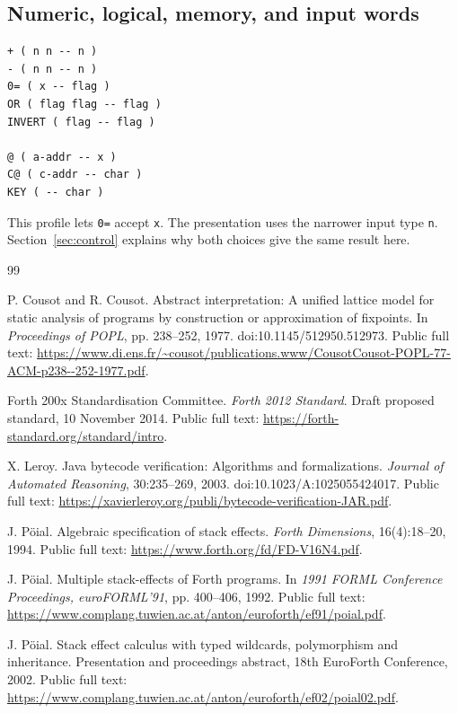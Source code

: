 \documentclass[11pt,a4paper]{article}
\begin{document}
\subsection{Numeric, logical, memory, and input words}
\begin{verbatim}
+ ( n n -- n )
- ( n n -- n )
0= ( x -- flag )
OR ( flag flag -- flag )
INVERT ( flag -- flag )

@ ( a-addr -- x )
C@ ( c-addr -- char )
KEY ( -- char )
\end{verbatim}
This profile lets \texttt{0=} accept \texttt{x}.  The presentation uses the
narrower input type \texttt{n}.  Section~\ref{sec:control} explains why both
choices give the same result here.

\begin{thebibliography}{99}
\footnotesize
\setlength{\itemsep}{0pt}
\setlength{\parsep}{0pt}
\raggedright

P. Cousot and R. Cousot.
\newblock Abstract interpretation: A unified lattice model for static analysis
of programs by construction or approximation of fixpoints.
\newblock In \emph{Proceedings of POPL}, pp. 238--252, 1977.
\newblock doi:10.1145/512950.512973.
\newblock Public full text:
\url{https://www.di.ens.fr/~cousot/publications.www/CousotCousot-POPL-77-ACM-p238--252-1977.pdf}.

Forth 200x Standardisation Committee.
\newblock \emph{Forth 2012 Standard}.
\newblock Draft proposed standard, 10 November 2014.
\newblock Public full text:
\url{https://forth-standard.org/standard/intro}.

X. Leroy.
\newblock Java bytecode verification: Algorithms and formalizations.
\newblock \emph{Journal of Automated Reasoning}, 30:235--269, 2003.
\newblock doi:10.1023/A:1025055424017.
\newblock Public full text:
\url{https://xavierleroy.org/publi/bytecode-verification-JAR.pdf}.

J. Pöial.
\newblock Algebraic specification of stack effects.
\newblock \emph{Forth Dimensions}, 16(4):18--20, 1994.
\newblock Public full text:
\url{https://www.forth.org/fd/FD-V16N4.pdf}.

J. Pöial.
\newblock Multiple stack-effects of Forth programs.
\newblock In \emph{1991 FORML Conference Proceedings, euroFORML'91},
pp. 400--406, 1992.
\newblock Public full text:
\url{https://www.complang.tuwien.ac.at/anton/euroforth/ef91/poial.pdf}.

J. Pöial.
\newblock Stack effect calculus with typed wildcards, polymorphism and
inheritance.
\newblock Presentation and proceedings abstract, 18th EuroForth Conference,
2002.
\newblock Public full text:
\url{https://www.complang.tuwien.ac.at/anton/euroforth/ef02/poial02.pdf}.


\end{thebibliography}
\end{document}
